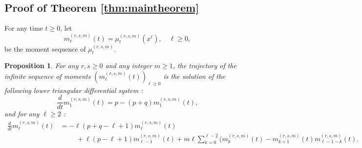 \documentclass[12pt,reqno]{amsart}
\newtheorem{proposition}{Proposition}
\begin{document}
\subsection{Proof of Theorem \ref{thm:maintheorem}}
For any time $t \geq 0$, let
\begin{equation*}
	m_{\ell}^{(r,s,m)}(t) =  \mu^{(r,s,m)}_t(x^\ell), \quad \ell \geq 0,
\end{equation*}
be the moment sequence of $\mu_t^{(r,s,m)}$.
\begin{proposition}\label{prop:momentsroots}
	For any $r,s \geq 0$ and any integer $m \geq 1$, the trajectory of the infinite sequence of moments $(m_{\ell}^{(r,s,m)}(t))_{\ell\geq 0}$ is the solution of the following lower triangular differential system :
	\begin{equation*}
		\frac{d}{dt}m_1^{(r,s,m)}(t)=p  -(p+q) m_1^{(r,s,m)}(t),
	\end{equation*}
	and for any $\ell\ge2$ :
	\begin{align}\label{ODEmoments}
		\frac{d}{dt}m_{\ell}^{(r,s,m)}(t)&= -\ell(p+q-\ell+1) m_{\ell}^{(r,s,m)}(t) \\
        &\nonumber \hspace{1cm}+ \ell(p-\ell+1)  m_{\ell-1}^{(r,s,m)}(t)
		+m\ell\sum_{k=0}^{\ell-2}(m_{k}^{(r,s,m)}(t)-m_{k+1}^{(r,s,m)}(t)m_{\ell-1-k}^{(r,s,m)}(t).
	\end{align}
\end{proposition}
\end{document}
